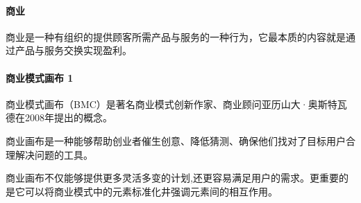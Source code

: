 \documentclass[letterpaper,11pt,english]{sphinxmanual}
\begin{document}
\paragraph{商业}
\label{\detokenize{chapter_idea/business:id2}}
商业是一种有组织的提供顾客所需产品与服务的一种行为，它最本质的内容就是通过产品与服务交换实现盈利。


\paragraph{商业模式画布 1\sphinxfootnotemark[118]}
\label{\detokenize{chapter_idea/business:id3}}%
\begin{footnotetext}[118]\sphinxAtStartFootnote
{}
%
\end{footnotetext}\ignorespaces 
商业模式画布（BMC）是著名商业模式创新作家、商业顾问亚历山大·奥斯特瓦德在2008年提出的概念。

商业画布是一种能够帮助创业者催生创意、降低猜测、确保他们找对了目标用户合理解决问题的工具。

商业画布不仅能够提供更多灵活多变的计划,还更容易满足用户的需求。更重要的是它可以将商业模式中的元素标准化井强调元素间的相互作用。
\end{document}
